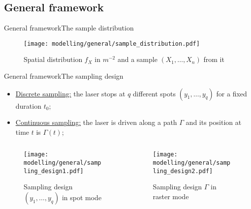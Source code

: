 \subsection{General framework}
\begin{frame}{General framework}{The sample distribution}
	\begin{figure}[H]
		\label{mapping1}\caption{Spatial distribution $f_{X}$ in $m^{-2}$ and a sample $(X_{1}, \hdots, X_{n})$ from it}
		\centering
    	\texttt{[image: modelling/general/sample\_distribution.pdf]}
	\end{figure}
\end{frame}

\begin{frame}{General framework}{The sampling design}
\begin{itemize}
\item \underline{Discrete sampling:} the laser stops at $q$ different spots $(y_{1}, \hdots, y_{q})$ for a fixed duration $t_{0}$;
\item \underline{Continuous sampling:} the laser is driven along a path $\Gamma$ and its position at time $t$ is $\Gamma(t)$;
\end{itemize}

\begin{columns}[c]
	\begin{column}{5.75cm}
			\begin{figure}[H]
		\label{mapping1}\caption{Sampling design $(y_{1}, \hdots, y_{q})$ in spot mode}
		\centering
    	\texttt{[image: modelling/general/sampling\_design1.pdf]}
	\end{figure}
	\end{column}
	\begin{column}{5.75cm}
			\begin{figure}[H]
		\label{mapping1}\caption{Sampling design $\Gamma$ in raster mode}
		\centering
    	\texttt{[image: modelling/general/sampling\_design2.pdf]}
	\end{figure}
	\end{column}
\end{columns}
\end{frame}


